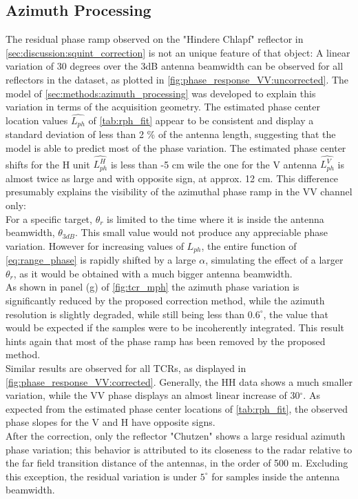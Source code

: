\subsection{Azimuth Processing}\label{sec:discussion:azimuth_processing}
The residual phase ramp observed on the "Hindere Chlapf" reflector in \autoref{sec:discussion:squint_correction} is not an unique feature of that object: A linear variation of 30 degrees over the 3dB antenna beamwidth can be observed for all reflectors in the dataset, as plotted in \autoref{fig:phase_response_VV:uncorrected}.  The model of \autoref{sec:methods:azimuth_processing} was developed to explain this variation in terms of the acquisition geometry.
The estimated phase center location values $\hat{L_{ph}}$ of \autoref{tab:rph_fit} appear to be consistent and display a standard deviation of less than 2 \% of the antenna length, suggesting that the model is able to predict most of the phase variation. The estimated phase center shifts for the H unit $\hat{L_{ph}^{H}}$ is less than -5 cm wile the one for the V antenna $\hat{L_{ph}^{V}}$ is almost twice as large and with opposite sign, at approx. 12 cm. This difference presumably explains the visibility of the azimuthal phase ramp in the VV channel only:\\
For a specific target,  $\theta_r$ is limited to the time where it is inside the antenna beamwidth, $\theta_{3dB}$. This small value would not produce any appreciable phase variation. However for increasing values of $L_{ph}$, the entire function of \autoref{eq:range_phase} is rapidly shifted  by a large $\alpha$, simulating the effect of a larger $\theta_r$, as it would be obtained with a much bigger antenna beamwidth.\\
As shown in panel (g) of \autoref{fig:tcr_mph} the azimuth phase variation is significantly reduced by the proposed correction method, while the azimuth resolution is slightly degraded, while still being less than $0.6^\circ$, the value that would be expected if the samples were to be incoherently integrated. This result hints again that most of the phase ramp has been removed by the proposed method.\\
Similar results are observed for all TCRs, as displayed in \autoref{fig:phase_response_VV:corrected}.  Generally, the HH data shows a much smaller variation, while the VV phase displays an almost linear increase of 30$^\circ$. As expected from the estimated phase center locations of \autoref{tab:rph_fit}, the observed phase slopes for the V and H have opposite signs.\\  After the correction, only the reflector "Chutzen" shows a large residual azimuth phase variation; this behavior is attributed to its closeness to the radar relative to the far field transition distance of the antennas, in the order of 500 m. Excluding this exception, the residual variation is under $5^\circ$ for samples inside the antenna beamwidth.
